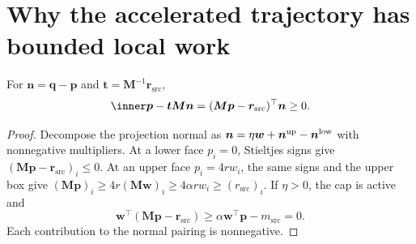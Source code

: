 \section{Why the accelerated trajectory has bounded local work}
\label{sec:det-op2-local-work}

\begin{lemma}
\label{lem:det-op2-sector}
For $\bm{n}=\bm{q}-\bm{p}$ and
$\bm{t}=\bm{M}^{-1}\bm{r}_{\mathrm{src}}$,
\[
 \ip{\bm{p}-\bm{t}}{\bm{M}\bm{n}}
       =(\bm{M}\bm{p}-\bm{r}_{\mathrm{src}})^{\top}\bm{n}\geq0.
\]
\end{lemma}
\begin{proof}
Decompose the projection normal as
$\bm{n}=\eta\bm{w}+\bm{n}^{\rm up}-\bm{n}^{\rm low}$ with nonnegative
multipliers. At a lower face $p_i=0$, Stieltjes signs give
$(\bm{M}\bm{p}-\bm{r}_{\mathrm{src}})_i\leq0$.
At an upper face $p_i=4rw_i$, the same signs and the upper box give
$(\bm{M}\bm{p})_i\geq4r(\bm{M}\bm{w})_i
\geq4\alpha rw_i\geq(r_{\mathrm{src}})_i$.
If $\eta>0$, the cap is active and
\[
 \bm{w}^{\top}(\bm{M}\bm{p}-\bm{r}_{\mathrm{src}})
 \geq\alpha\bm{w}^{\top}\bm{p}-m_{\mathrm{src}}=0.
\]
Each contribution to the normal pairing is nonnegative.
\end{proof}


